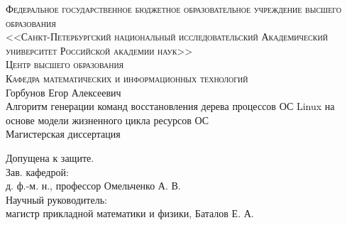 \begin{titlepage}

\newcommand{\HRule}{\rule{\linewidth}{0.5mm}} %

\begin{center}
 

\textsc{Федеральное государственное бюджетное
образовательное учреждение высшего образования \\
<<Санкт-Петербургский национальный исследовательский
Академический университет Российской академии наук>>}\\
\textsc{Центр высшего образования}\\
\vspace{0.5cm}
\textsc{Кафедра математических и информационных технологий}\\[3cm]

{ \Large Горбунов Егор Алексеевич}\\[1cm]
{ \Huge  Алгоритм генерации команд восстановления дерева процессов ОС Linux на основе модели жизненного цикла ресурсов ОС}\\[0.5cm]
{ \large Магистерская диссертация }\\[1cm]
 

\begin{minipage}{1\textwidth}
\begin{flushright} 
\large
Допущена к защите.\\[-0.35cm]
Зав. кафедрой:\\[-0.35cm]
д. ф.-м. н., профессор Омельченко А. В.\\[1cm]

Научный руководитель:\\[-0.35cm]
магистр прикладной математики и физики, Баталов Е. А.\\[1cm]


\end{flushright}
\end{minipage}
\end{center}
\end{titlepage}
